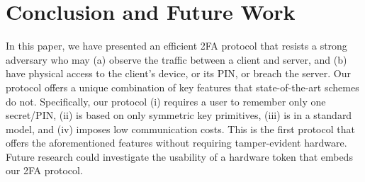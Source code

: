 

\section{Conclusion and Future Work}

In this paper, we have presented an efficient 2FA protocol that resists a strong adversary who may (a) observe the traffic between a client and server, and (b) have physical access to the client’s device, or its PIN, or breach the server. Our protocol offers a unique combination of key features that state-of-the-art schemes do not. Specifically,  our protocol (i) requires a user to remember only one secret/PIN, (ii) is based on only symmetric key primitives, (iii) is in a standard model, and (iv) imposes low communication costs. This is the first protocol that offers the aforementioned features without requiring tamper-evident hardware. Future research could investigate the usability of a hardware token that embeds our 2FA protocol. 

